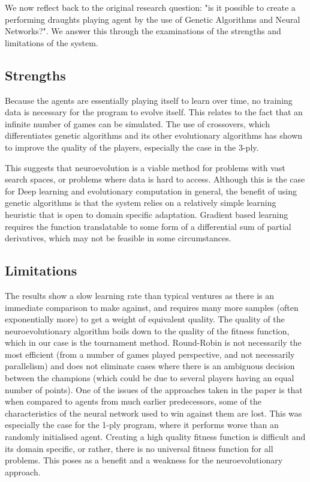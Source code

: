 \documentclass[12pt,a4paper]{article}
\begin{document}
    We now reflect back to the original research question: "is it possible to create a performing draughts playing agent by the use of Genetic Algorithms and Neural Networks?".  We answer this through the examinations of the strengths and limitations of the system. 

    \subsection{Strengths}
    Because the agents are essentially playing itself to learn over time, no training data is necessary for the program to evolve itself. This relates to the fact that an infinite number of games can be simulated. The use of crossovers, which differentiates genetic algorithms and its other evolutionary algorithms has shown to improve the quality of the players, especially the case in the 3-ply.
    
    This suggests that neuroevolution is a viable method for problems with vast search spaces, or problems where data is hard to access. Although this is the case for Deep learning and evolutionary computation in general, the benefit of using genetic algorithms is that the system relies on a relatively simple learning heuristic that is open to domain specific adaptation. Gradient based learning requires the function  translatable to some form of a differential sum of partial derivatives, which may not be feasible in some circumstances.

    \subsection{Limitations}
    The results show a slow learning rate than typical ventures as there is an immediate comparison to make against, and requires many more samples (often exponentially more) to get a weight of equivalent quality.
    The quality of the neuroevolutionary algorithm boils down to the quality of the fitness function, which in our case is the tournament method. Round-Robin is not necessarily the most efficient (from a number of games played perspective, and not necessarily parallelism) and does not eliminate cases where there is an ambiguous decision between the champions (which could be due to several players having an equal number of points). One of the issues of the approaches taken in the paper is that when compared to agents from much earlier predecessors, some of the characteristics of the neural network used to win against them are lost. This was especially the case for the 1-ply program, where it performs worse than an randomly initialised agent. Creating a high quality fitness function is difficult and its domain specific, or rather, there is no universal fitness function for all problems. This poses as a benefit and a weakness for the neuroevolutionary approach.
   
\end{document}

